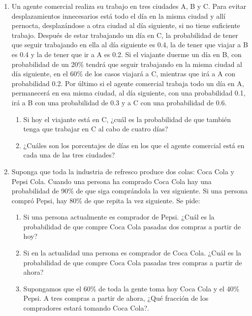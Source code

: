\documentclass{templateNote}
\begin{document}
\begin{enumerate}
    \newpage
    \item Un agente comercial realiza su trabajo en tres ciudades A, B y C. Para evitar
    desplazamientos innecesarios está todo el día en la misma ciudad y allí
    pernocta, desplazándose a otra ciudad al día siguiente, si no tiene suficiente
    trabajo. Después de estar trabajando un día en C, la probabilidad de tener que
    seguir trabajando en ella al día siguiente es 0.4, la de tener que viajar a B es 0.4
    y la de tener que ir a A es 0.2. Si el viajante duerme un día en B, con
    probabilidad de un 20\% tendrá que seguir trabajando en la misma ciudad al día
    siguiente, en el 60\% de los casos viajará a C, mientras que irá a A con
    probabilidad 0.2. Por último si el agente comercial trabaja todo un día en A,
    permanecerá en esa misma ciudad, al día siguiente, con una probabilidad 0.1,
    irá a B con una probabilidad de 0.3 y a C con una probabilidad de 0.6.

    \begin{enumerate}[label=\alph*)]
        \item Si hoy el viajante está en C, ¿cuál es la probabilidad de que también tenga que trabajar en C al cabo de cuatro días?
        \item ¿Cuáles son los porcentajes de días en los que el agente comercial está en cada una de las tres ciudades?
    \end{enumerate}
    
    \newpage
    \item Suponga que toda la industria de refresco produce dos colas: Coca Cola y Pepsi Cola. Cuando una persona ha comprado Coca Cola hay una probabilidad de 90\% de que siga comprándola la vez siguiente. Si una persona compró Pepsi, hay 80\% de que repita la vez siguiente. Se pide:
    \begin{enumerate}[label=\alph*)]
        \item  Si una persona actualmente es comprador de Pepsi. ¿Cuál es la probabilidad de que compre Coca Cola pasadas dos compras a partir de hoy?
        \item Si en la actualidad una persona es comprador de Coca Cola. ¿Cuál es la probabilidad de que compre Coca Cola pasadas tres compras a partir de ahora?
        \item Supongamos que el 60\% de toda la gente toma hoy Coca Cola y el 40\% Pepsi. A tres compras a partir de ahora, ¿Qué fracción de los compradores estará tomando Coca Cola?.
    \end{enumerate}

\end{enumerate}
\end{document}

